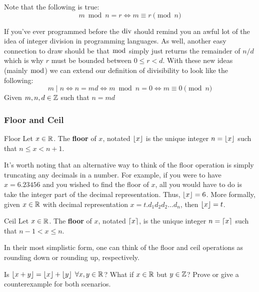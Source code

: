 \begin{note}{}{}
    Note that the following is true:
    \begin{equation*}
        m \bmod n = r \Leftrightarrow m \equiv r \pmod{n}
    \end{equation*}
\end{note}

If you've ever programmed before the $\operatorname{div}$ should remind you an awful lot of the idea of integer division in programming languages. As well, another easy connection to draw should be that $\bmod$ simply just returns the remainder of $n/d$ which is why $r$ must be bounded between $0 \leq r < d$. With these new ideas (mainly $\bmod$) we can extend our definition of divisibility to look like the following:
\begin{equation*}
    m \mid n \Leftrightarrow n = md \Leftrightarrow m \bmod n = 0 \Leftrightarrow m \equiv 0 \pmod{n}
\end{equation*}
Given $m, n, d \in \mathbb Z$ such that $n = md$

\subsubsection{Floor and Ceil}
\begin{definition}{Floor}{}
    Let $x \in \mathbb R$. The \textbf{floor} of $x$, notated $\left\lfloor x \right\rfloor$ is the unique integer $n = \left\lfloor x \right\rfloor$ such that $n \leq x < n+1$.
\end{definition}

It's worth noting that an alternative way to think of the floor operation is simply truncating any decimals in a number. For example, if you were to have $x = 6.23456$ and you wished to find the floor of $x$, all you would have to do is take the integer part of the decimal representation. Thus, $\left\lfloor x \right\rfloor = 6$. More formally, given $x \in \mathbb R$ with decimal representation $x = t.{d_1}{d_2}{d_2}\dots{d_n}$, then $\left\lfloor x \right\rfloor = t$.

\begin{definition}{Ceil}{}
    Let $x \in \mathbb R$. The \textbf{floor} of $x$, notated $\left\lceil x \right\rceil$, is the unique integer $n = \left\lceil x \right\rceil$ such that $n - 1 < x \leq n$.
\end{definition}

In their most simplistic form, one can think of the floor and ceil operations as rounding down or rounding up, respectively. 

\begin{question}{}{}
    Is $\left\lfloor x + y \right\rfloor = \left\lfloor x \right\rfloor + \left\lfloor y \right\rfloor \hspace{0.1cm} \forall x, y \in \mathbb R$? What if $x \in \mathbb R$ but $y \in \mathbb Z$?   Prove or give a counterexample for both scenarios.
\end{question}
